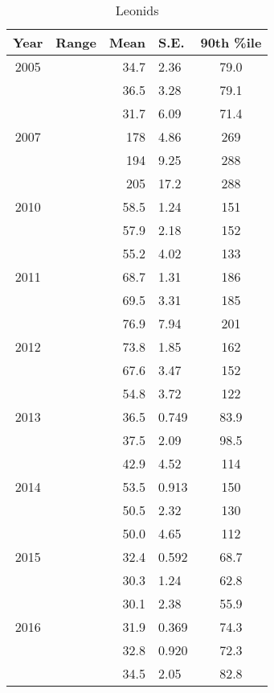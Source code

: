 \documentclass[a4paper,12pt,twocolumn]{report}
\begin{document}
\begin{appendices}
\begin{table*}
	\centering
	\begin{tabular}{|c|c|r@{ \,$\pm$\, }l|c|}
		\hline 
		Year & Range & Mean & S.E. & 90th \%ile\\ 
		\hline 
		2005 & & 34.7 & 2.36 & 79.0   \\ 
		\hline 
		& & 36.5 & 3.28 & 79.1   \\ 
		\hline 
		& & 31.7 & 6.09 & 71.4   \\ 
		\hline 
		2007 & & 178 & 4.86 & 269   \\ 
		\hline 
		& &	 194 & 9.25 & 288   \\ 
		\hline 
		& & 205 & 17.2 & 288   \\ 
		\hline 
		2010 & & 58.5 & 1.24 & 151   \\ 
		\hline 
		& &	 57.9 & 2.18 & 152   \\ 
		\hline 
		& & 55.2 & 4.02 & 133   \\ 
		\hline 
		2011 & & 68.7 & 1.31 & 186   \\ 
		\hline 
		& & 69.5 & 3.31 & 185   \\ 
		\hline 
		& & 76.9 & 7.94 & 201   \\ 
		\hline 
		2012 & & 73.8 & 1.85 & 162   \\ 
		\hline 
		& & 67.6 & 3.47 & 152   \\ 
		\hline 
		& & 54.8 & 3.72 & 122   \\ 
		\hline 
		2013 & & 36.5 & 0.749 & 83.9   \\ 
		\hline 
		& & 37.5 & 2.09 & 98.5   \\ 
		\hline 
		& & 42.9 & 4.52 & 114   \\ 
		\hline 
		2014 & & 53.5 & 0.913 & 150   \\ 
		\hline 
		& & 50.5 & 2.32 & 130   \\ 
		\hline 
		& & 50.0 & 4.65 & 112  \\ 
		\hline 
		2015 & & 32.4 & 0.592 & 68.7   \\ 
		\hline 
		& & 30.3 & 1.24 & 62.8   \\ 
		\hline 
		& & 30.1 & 2.38 & 55.9   \\ 
		\hline
		2016 & & 31.9 & 0.369 & 74.3	\\
		\hline 
		& & 32.8 & 0.920 & 72.3   \\ 
		\hline 
		& & 34.5 & 2.05 & 82.8   \\ 
		\hline 
	\end{tabular}
\caption{Leonids} 
\end{table*}


\end{appendices}
\end{document}
